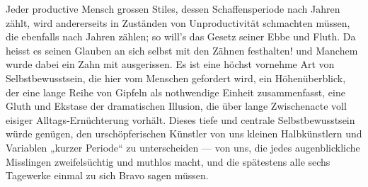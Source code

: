 Jeder productive Mensch grossen Stiles, dessen Schaffensperiode nach Jahren zählt, wird andererseits in Zuständen von Unproductivität schmachten müssen, die ebenfalls nach Jahren zählen; so will’s das Gesetz seiner Ebbe und Fluth. Da heisst es seinen Glauben an sich selbst mit den Zähnen festhalten! und Manchem wurde dabei ein Zahn mit ausgerissen. Es ist eine höchst vornehme Art von Selbstbewusstsein, die hier vom Menschen gefordert wird, ein Höhenüberblick, der eine lange Reihe von Gipfeln  als nothwendige Einheit zusammenfasst, eine Gluth und Ekstase der dramatischen Illusion, die über lange Zwischenacte voll eisiger Alltags-Ernüchterung vorhält. Dieses tiefe und centrale Selbstbewusstsein würde genügen, den urschöpferischen Künstler von uns kleinen Halbkünstlern und Variablen „kurzer Periode“ zu unterscheiden — von uns, die jedes augenblickliche Misslingen zweifelsüchtig und muthlos macht, und die spätestens alle sechs Tagewerke einmal zu sich Bravo sagen müssen.
\par


